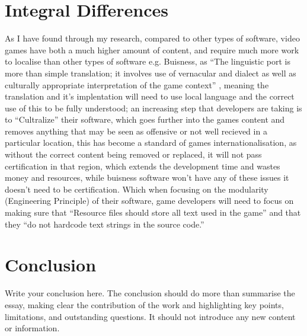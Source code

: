 \documentclass{scrartcl}
\begin{document}
\section{Integral Differences}
As I have found through my research, compared to other types of software, video games have both a much higher amount of content, and require much more work to localise than other types of software e.g. Buisness, as ``The linguistic port is more than simple translation; it involves use of vernacular and dialect as well as culturally appropriate interpretation of the game context'' \cite{losavio2014linguistic}, meaning the translation and it's implentation will need to use local language and the correct use of this to be fully understood; an increasing step that developers are taking is to ``Cultralize'' their software\cite{bestpractices}, which goes further into the games content and removes anything that may be seen as offensive or not well recieved in a particular location, this has become a standard of games internationalisation, as without the correct content being removed or replaced, it will not pass certification in that region, which extends the development time and wastes money and resources, while buisness software won't have any of these issues it doesn't need to be certification. Which when focusing on the modularity (Engineering Principle) of their software, game developers will need to focus on making sure that ``Resource files should store all text used in the game'' and that they ``do not hardcode text strings in the source code.''\cite{bestpractices}



\section{Conclusion}

Write your conclusion here. The conclusion should do more than summarise the essay, making clear the contribution of the work and highlighting key points, limitations, and outstanding questions. It should not introduce any new content or information.



\end{document}
